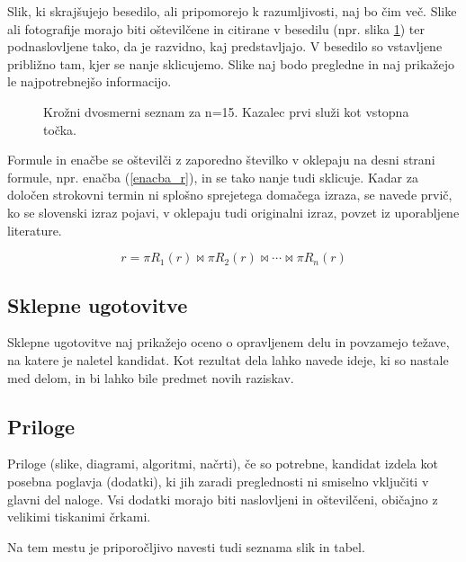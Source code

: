 \documentclass[12pt,a4paper,openany]{book}
\begin{document}
Slik, ki skrajšujejo besedilo, ali pripomorejo k razumljivosti, naj bo čim več. Slike ali fotografije morajo biti
oštevilčene in citirane v besedilu (npr. slika \ref{slika_seznam}) ter podnaslovljene tako, da je razvidno, kaj predstavljajo. V besedilo so
vstavljene približno tam, kjer se nanje sklicujemo. Slike naj bodo pregledne in naj prikažejo le najpotrebnejšo informacijo. 

\begin{figure}[htb]
\centerline{}
\caption[Krožni dvosmerni seznam.]{Krožni dvosmerni seznam za n=15. Kazalec prvi služi kot vstopna to\v cka.}
\label{slika_seznam}
\end{figure}

Formule in enačbe se oštevilči z zaporedno številko v oklepaju na desni strani formule, npr. enačba (\ref{enacba_r}), 
in se tako nanje tudi sklicuje. Kadar za določen strokovni termin ni splošno sprejetega domačega izraza, se navede prvič, ko se slovenski izraz
pojavi, v oklepaju tudi originalni izraz, povzet iz uporabljene literature.

\begin{equation}
r = \pi R_1 (r) \bowtie \pi R_2 (r) \bowtie \cdots \bowtie  \pi R_n  (r)
\label{enacba_r}
\end{equation}

\subsection{Sklepne ugotovitve}

Sklepne ugotovitve naj prikažejo oceno o opravljenem delu in povzamejo težave, na katere je naletel kandidat. Kot rezultat dela
lahko navede ideje, ki so nastale med delom, in bi lahko bile predmet novih raziskav.

\subsection{Priloge}
Priloge (slike, diagrami, algoritmi, načrti), 
če so potrebne, kandidat izdela kot posebna poglavja (dodatki), ki jih zaradi preglednosti ni smiselno vključiti v glavni del naloge. Vsi
dodatki morajo biti naslovljeni in oštevilčeni, običajno z velikimi tiskanimi črkami. 

Na tem mestu je priporočljivo navesti tudi seznama slik in tabel.
\end{document}
